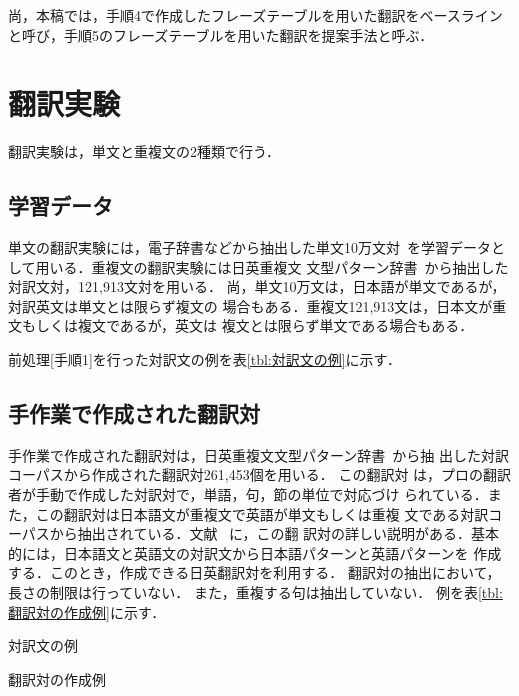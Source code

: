 \documentclass[japanese]{jnlp_1.4}
\begin{document}
尚，本稿では，手順4で作成したフレーズテーブルを用いた翻訳をベースライン
と呼び，手順5のフレーズテーブルを用いた翻訳を提案手法と呼ぶ．



\section{翻訳実験}
\label{翻訳実験の結果}

翻訳実験は，単文と重複文の2種類で行う．

\subsection{学習データ}
\label{sec:trainingdata}

単文の翻訳実験には，電子辞書などから抽出した単文10万文対~\cite{murakami}を学習データとして用いる．重複文の翻訳実験には日英重複文
文型パターン辞書~\cite{tori}から抽出した対訳文対，121,913文対を用いる．
尚，単文10万文は，日本語が単文であるが，対訳英文は単文とは限らず複文の
場合もある．重複文121,913文は，日本文が重文もしくは複文であるが，英文は
複文とは限らず単文である場合もある．

前処理[手順1]を行った対訳文の例を表\ref{tbl:対訳文の例}に示す．



\subsection{手作業で作成された翻訳対}
\label{sec:translationpair}

手作業で作成された翻訳対は，日英重複文文型パターン辞書~\cite{tori}から抽
出した対訳コーパスから作成された翻訳対261,453個を用いる． この翻訳対
は，プロの翻訳者が手動で作成した対訳対で，単語，句，節の単位で対応づけ
られている．また，この翻訳対は日本語文が重複文で英語が単文もしくは重複
文である対訳コーパスから抽出されている．文献~\cite{ikehara} に，この翻
訳対の詳しい説明がある．基本的には，日本語文と英語文の対訳文から日本語パターンと英語パターンを
作成する．このとき，作成できる日英翻訳対を利用する．
翻訳対の抽出において，長さの制限は行っていない．
また，重複する句は抽出していない．
例を表\ref{tbl:翻訳対の作成例}に示す．

\begin{table}[t]
\caption{対訳文の例}
\label{tbl:対訳文の例}

\end{table}
\begin{table}[t]
\caption{翻訳対の作成例}
\label{tbl:翻訳対の作成例}

\end{table}
\end{document}
